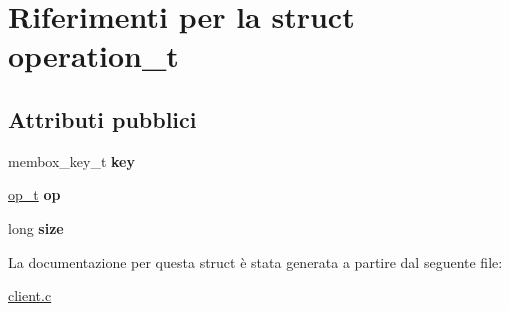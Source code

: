 \hypertarget{structoperation__t}{}\section{Riferimenti per la struct operation\+\_\+t}
\label{structoperation__t}
\subsection*{Attributi pubblici}
\begin{DoxyCompactItemize}
\item 
membox\+\_\+key\+\_\+t {\bfseries key}\hypertarget{structoperation__t_a58422637d6b9ed0081270dff03a42f42}{}\label{structoperation__t_a58422637d6b9ed0081270dff03a42f42}

\item 
\hyperlink{ops_8h_ac6fa1b34da8872e34c2936391332f44c}{op\+\_\+t} {\bfseries op}\hypertarget{structoperation__t_afa66e43cb50d2792e12f7a2b054bc396}{}\label{structoperation__t_afa66e43cb50d2792e12f7a2b054bc396}

\item 
long {\bfseries size}\hypertarget{structoperation__t_a453c2473442f61fbc268d30c8ebb4338}{}\label{structoperation__t_a453c2473442f61fbc268d30c8ebb4338}

\end{DoxyCompactItemize}


La documentazione per questa struct è stata generata a partire dal seguente file\+:\begin{DoxyCompactItemize}
\item 
\hyperlink{client_8c}{client.\+c}\end{DoxyCompactItemize}
